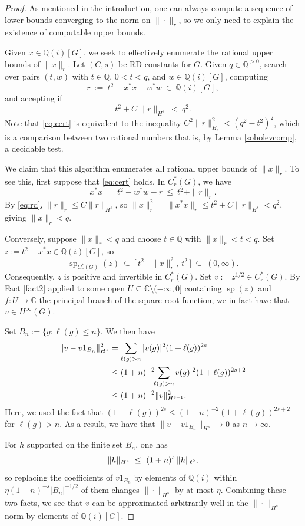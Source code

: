 \documentclass{amsart}
\newcommand{\Q}{\mathbb{Q}}
\DeclareMathOperator{\spec}{sp}
\newcommand{\Cr}{C^*_r(G)}
\newcommand{\Qi}{\Q(i)}
\theoremstyle{plain}
\theoremstyle{definition}
\numberwithin{equation}{section}
\begin{document}
\begin{proof}
As mentioned in the introduction, one can always compute a sequence of lower bounds converging to the norm on $\|\cdot\|_r$, so we only need to explain the existence of computable upper bounds.

Given $x\in \mathbb{Q}(i)[G]$, we seek to effectively enumerate the rational upper bounds of $\|x\|_r$.  Let $(C,s)$ be RD constants for $G$.  Given $q\in\Q^{>0}$, search over pairs $(t,w)$ with $t\in\Q$, $0<t<q$, and $w\in\Qi[G]$, computing
\[
r\ :=\ t^2-x^*x-w^*w\ \in\ \Qi[G],
\]
and accepting if
\begin{equation}\label{eq:cert}
t^2+C\,\|r\|_{H^s}\ <\ q^2 .
\end{equation}
Note that \eqref{eq:cert} is equivalent to the inequality $C^2\|r\|_{H_s}^2<(q^2-t^2)^2$, which is a comparison between two rational numbers that is, by Lemma \ref{sobolevcomp}, a decidable test.  

We claim that this algorithm enumerates all rational upper bounds of $\|x\|_r$.  To see this, first suppose that \eqref{eq:cert} holds. In $\Cr$, we have
\[
x^*x\ =\ t^2-w^*w-r\ \le\ t^2+\|r\|_r.
\]
By \eqref{eq:rd}, $\|r\|_r\le C\|r\|_{H^s}$, so $\|x\|_r^2=\|x^*x\|_r\le t^2+C\|r\|_{H^s}<q^2$, giving $\|x\|_r<q$.

Conversely, suppose $\|x\|_r<q$ and choose $t\in\Q$ with $\|x\|_r<t<q$. Set $z:=t^2-x^*x\in\Qi[G]$, so
\[
\spec_{\Cr}(z)\ \subseteq\ \big[\,t^2-\|x\|_r^2,\ t^2\,\big]\ \subseteq\ (0,\infty).
\]
Consequently, $z$ is positive and invertible in $\Cr$.  Set $v:=z^{1/2}\in \Cr$.  By Fact \ref{fact2} applied to some open $U\subseteq \mathbb{C}\setminus (-\infty,0]$ containing $\spec(z)$ and$f:U\to \mathbb{C}$ the principal branch of the square root function, we in fact have that $v\in H^\infty(G)$. 

 
Set $B_n:=\{g:\ell(g)\le n\}$.  
We then have
\begin{alignat}{2}
\|v-v1_{B_n}\|_{H^{s}}^2&=\sum_{\ell(g)>n}|v(g)|^2(1+\ell(g))^{2s}\notag \\ \notag
    &\le(1+n)^{-2}\!\!\sum_{\ell(g)>n}\!\!|v(g)|^2(1+\ell(g))^{2s+2}\\ \notag
    &\le(1+n)^{-2}\|v\|_{H^{s+1}}^2.\notag
\end{alignat}
Here, we used the fact that $(1+\ell(g))^{2s}\le(1+n)^{-2}(1+\ell(g))^{2s+2}$ for $\ell(g)>n$.  As a result, we have that $\|v-v1_{B_n}\|_{H^{s}}\to 0$ as $n\to \infty$.

For $h$ supported on the finite set $B_n$, one has
\begin{equation}
\|h\|_{H^{s}}\ \le\ (1+n)^{s}\,\|h\|_{\ell^2},\notag
\end{equation}
so replacing the coefficients of $v1_{B_n}$ by elements of $\Qi$ within $\eta(1+n)^{-s}|B_n|^{-1/2}$ of them changes $\|\cdot\|_{H^{s}}$ by at most $\eta$.  Combining these two facts, we see that $v$ can be approximated arbitrarily well in the $\|\cdot\|_{H^{s}}$ norm by elements of $\Qi[G]$.


\end{proof}
\end{document}
